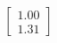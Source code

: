 \documentclass[preview]{standalone}
\begin{document}
\begin{align*}
\begin{bmatrix} 1.00 \\ 1.31 \end{bmatrix}
\end{align*}
\end{document}
